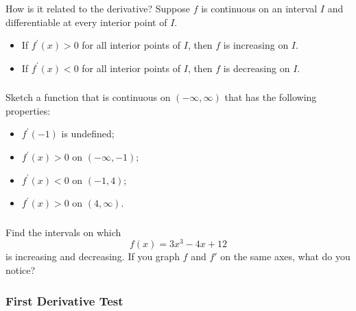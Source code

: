 \documentclass[cal1spr16Lectures.tex]{subfiles}
\begin{document}
\begin{frame}{\small How is it related to the derivative?}
Suppose $f$ is continuous on an interval $I$ and differentiable at every interior point of $I$.

\vspace{1pc}
\begin{itemize}
\item If \alert{$f^{\prime}(x)>0$} for all interior points of $I$, then $f$ is \alert{increasing} on $I$.

\vspace{1pc}
\item If \alert{$f^{\prime}(x)<0$} for all interior points of $I$, then $f$ is \alert{decreasing} on $I$.
\end{itemize}
\end{frame}

\begin{frame}%
\frametitle{}
\begin{ex} Sketch a function that is continuous on $(-\infty,\infty)$ that has the following properties:

\begin{itemize}
\item $f^{\prime}(-1)$ is undefined;

\vspace{1pc}
\item $f^{\prime}(x)>0$ on $(-\infty,-1)$;

\vspace{1pc}
\item $f^{\prime}(x)<0$ on $(-1,4)$;

\vspace{1pc}
\item $f^{\prime}(x)>0$ on $(4,\infty)$.
\end{itemize}
\end{ex}
\end{frame}

\begin{frame}%
\frametitle{}
\begin{ex} Find the intervals on which
$$f(x)=3x^3-4x+12$$
is increasing and decreasing.  If you graph $f$ and $f'$ on the same axes, what do you notice?
\end{ex}
\end{frame}

\subsubsection{First Derivative Test}
\end{document}
